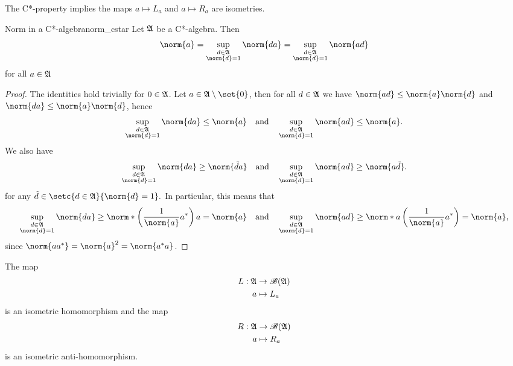 The C*-property implies the maps \(a \mapsto L_a\) and \(a \mapsto R_a\) are isometries.
\begin{proposition}{Norm in a C*-algebra}{norm_cstar}
    Let \(\mathfrak{A}\) be a C*-algebra. Then
    \begin{equation*}
        \norm{a} = \sup_{\substack{d \in \algebra{A}\\\norm{d} = 1}}{\norm{da}}= \sup_{\substack{d \in \algebra{A}\\\norm{d} = 1}}{\norm{ad}}
    \end{equation*}
    for all \(a \in \mathfrak{A}\)
\end{proposition}
\begin{proof}
    The identities hold trivially for \(0\in \mathfrak{A}\). Let \(a \in \algebra{A} \setminus \set{0}\), then for all \(d \in \mathfrak{A}\) we have \(\norm{ad} \leq \norm{a} \norm{d}\) and \(\norm{da} \leq \norm{a} \norm{d}\), hence
    \begin{equation*}
        \sup_{\substack{d \in \algebra{A}\\\norm{d} = 1}}{\norm{da}} \leq \norm{a}
        \quad\text{and}\quad
        \sup_{\substack{d \in \algebra{A}\\\norm{d} = 1}}{\norm{ad}} \leq \norm{a}.
    \end{equation*}
    We also have
    \begin{equation*}
        \sup_{\substack{d \in \algebra{A}\\\norm{d} = 1}}{\norm{da}} \geq \norm{\tilde{d}a}
        \quad\text{and}\quad
        \sup_{\substack{d \in \algebra{A}\\\norm{d} = 1}}{\norm{ad}} \geq \norm{a\tilde{d}}.
    \end{equation*}
    for any \(\tilde{d} \in \setc{d \in \algebra{A}}{\norm{d} = 1}.\) In particular, this means that
    \begin{equation*}
        \sup_{\substack{d \in \algebra{A}\\\norm{d} = 1}}{\norm{da}} \geq \norm*{\left(\frac{1}{\norm{a}}a^*\right)a} = \norm{a}
        \quad\text{and}\quad
        \sup_{\substack{d \in \algebra{A}\\\norm{d} = 1}}{\norm{ad}} \geq \norm*{a\left(\frac{1}{\norm{a}}a^*\right)} = \norm{a},
    \end{equation*}
    since \(\norm{aa^*} = \norm{a}^2 = \norm{a^*a}\).
\end{proof}
\begin{corollary}
    The map
    \begin{align*}
        L : \mathfrak{A} &\to \mathscr{B}(\mathfrak{A})\\
        a &\mapsto L_a
    \end{align*}
    is an isometric homomorphism and the map
    \begin{align*}
        R : \mathfrak{A} &\to \mathscr{B}(\mathfrak{A})\\
        a &\mapsto R_a
    \end{align*}
    is an isometric anti-homomorphism.
\end{corollary}
